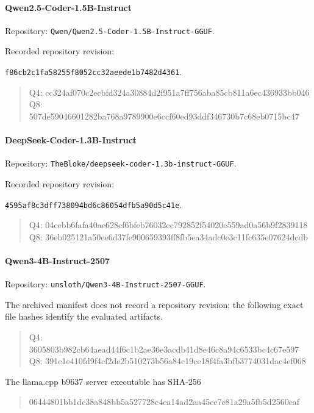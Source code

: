 \paragraph{Qwen2.5-Coder-1.5B-Instruct}\mbox{}\par Repository: \nolinkurl{Qwen/Qwen2.5-Coder-1.5B-Instruct-GGUF}.\par
Recorded repository revision:\par {\footnotesize\texttt{f86cb2c1fa58255f8052cc32aeede1b7482d4361}}.\par
\begin{quote}\footnotesize\ttfamily
Q4: cc324af070c2ecbfd324a30884d2f951a7ff756aba85cb811a6ec436933bb046\\
Q8: 507de59046601282ba768a9789900e6ccf60ed93ddf346730b7c68eb0715bc47\\
\end{quote}
\paragraph{DeepSeek-Coder-1.3B-Instruct}\mbox{}\par Repository: \nolinkurl{TheBloke/deepseek-coder-1.3b-instruct-GGUF}.\par
Recorded repository revision:\par {\footnotesize\texttt{4595af8c3dff738094bd6c86054dfb5a90d5c41e}}.\par
\begin{quote}\footnotesize\ttfamily
Q4: 04cebb6fafa40ae628cf6bfeb76032ec792852f54020c559ad0a56b9f2839118\\
Q8: 36eb025121a50ee6d37fe900659393ff8fb5ea34adc0e3c11fc635e07624dcdb\\
\end{quote}
\paragraph{Qwen3-4B-Instruct-2507}\mbox{}\par Repository: \nolinkurl{unsloth/Qwen3-4B-Instruct-2507-GGUF}.\par
The archived manifest does not record a repository revision; the following exact file hashes identify the evaluated artifacts.
\begin{quote}\footnotesize\ttfamily
Q4: 3605803b982cb64aead44f6c1b2ae36e3acdb41d8e46c8a94c6533bc4c67e597\\
Q8: 391c1e410fd9f4cf2de2b510273b56a84c19ce18f4fa3bfb3774031dac4ef068\\
\end{quote}
The llama.cpp b9637 server executable has SHA-256
\begin{quote}\footnotesize\ttfamily
06444801bb1dc38a848bb5a527728c4ea14ad2aa45ce7e81a29a5fb5d2560eaf
\end{quote}